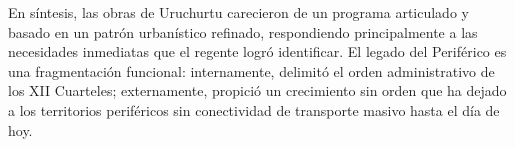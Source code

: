 En síntesis, las obras de Uruchurtu carecieron de un programa articulado y
basado en un patrón urbanístico refinado, respondiendo principalmente a las
necesidades inmediatas que el regente logró identificar. El legado del
Periférico es una fragmentación funcional: internamente, delimitó el orden
administrativo de los XII Cuarteles; externamente, propició un crecimiento sin
orden que ha dejado a los territorios periféricos sin conectividad de transporte
masivo hasta el día de hoy.
